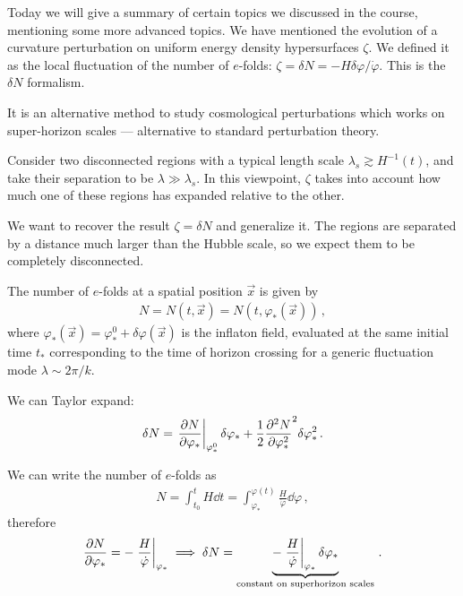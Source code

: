 \documentclass[main.tex]{subfiles}
\begin{document}

Today we will give a summary of certain topics we discussed in the course, mentioning some more advanced topics.
We have mentioned the evolution of a curvature perturbation on uniform energy density hypersurfaces \(\zeta \).
We defined it as the local fluctuation of the number of \(e\)-folds: \(\zeta = \delta N = - H \delta \varphi / \dot{\varphi}\). 
This is the \(\delta N\) formalism. 

It is an alternative method to study cosmological perturbations which works on super-horizon scales --- alternative to standard perturbation theory. 

Consider two disconnected regions with a typical length scale \(\lambda _s \gtrsim H^{-1}(t)\), and take their separation to be \(\lambda \gg \lambda _s\). 
In this viewpoint, \(\zeta \) takes into account how much one of these regions has expanded relative to the other.

We want to recover the result \(\zeta = \delta N\) and generalize it. 
The regions are separated by a distance much larger than the Hubble scale, so we expect them to be completely disconnected. 

The number of \(e\)-folds at a spatial position \(\vec{x}\) is given by 
%
\begin{align}
N = N(t, \vec{x}) = N(t, \varphi_*(\vec{x}))
\,,
\end{align}
%
where \(\varphi_* (\vec{x}) = \varphi^{0}_{*} + \delta \varphi (\vec{x})\) is the inflaton field, evaluated at the same initial time \(t_*\) corresponding to the time of horizon crossing for a generic fluctuation mode \(\lambda \sim 2 \pi / k\). 


We can Taylor expand: 
%
\begin{align}
\delta N = \eval{\pdv{N}{\varphi _*}}_{\varphi_*^{0}} \delta \varphi _*
+ \frac{1}{2} \pdv[2]{N}{\varphi _*} (\delta \varphi _*)^2
\delta \varphi^2_*
\,.
\end{align}

We can write the number of \(e\)-folds as 
%
\begin{align}
N = \int_{t_0 }^{t} H \dd{t} 
= \int_{\varphi _*}^{\varphi (t)}  \frac{H}{\dot{\varphi}} \dd{\varphi }
\,,
\end{align}
%
therefore 
%
\begin{align}
\pdv{N}{\varphi _*} = - \eval{\frac{H}{\dot{\varphi}}}_{\varphi _*} 
\implies
\delta N = \underbrace{- \eval{\frac{H}{\dot{\varphi}}}_{\varphi _*} \delta \varphi _*}_{\text{constant on superhorizon scales}}
\,.
\end{align}
\end{document}
